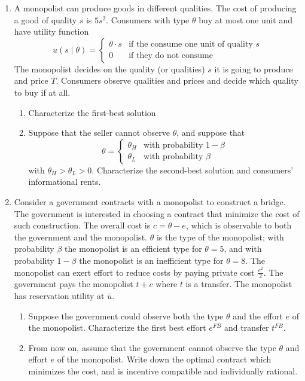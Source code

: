 \documentclass[12pt]{article}
\begin{document}
\begin{enumerate}
	\item A monopolist can produce goods in different qualities. The cost of producing a good of quality $s$ is $5s^2$. Consumers with type $\theta$ buy at most one unit and have utility function
	\[
	u(s \mid \theta) = \begin{cases} \theta \cdot s & \text{if the consume one unit of quality $s$} \\ 0 & \text{if they do not consume} \end{cases}
	\]
	The monopolist decides on the quality (or qualities) $s$ it is going to produce and price $T$. Consumers observe qualities and prices and decide which quality to buy if at all.
	\begin{enumerate}
		\item Characterize the first-best solution
		\item Suppose that the seller cannot observe $\theta$, and suppose that 
		\[
		\theta = \begin{cases} \theta_H & \text{with probability } 1-\beta \\ \theta_L & \text{with probability } \beta \end{cases}
		\]
		with $\theta_H > \theta_L > 0$. Characterize the second-best solution and consumers’ informational rents.
	\end{enumerate}
	\item Consider a government contracts with a monopolist to construct a bridge. The government is interested in choosing a contract that minimize the cost of such construction. The overall cost is $c = \theta - e$, which is observable to both the government and the monopolist. $\theta$ is the type of the monopolist; with probability $\beta$ the monopolist is an efficient type for $\theta = 5$, and with probability $1-\beta$ the monopolist is an inefficient type for $\theta = 8$. The monopolist can exert effort to reduce costs by paying private cost $\frac{e^2}{2}$. The government pays the monopolist $t + c$ where $t$ is a transfer. The monopolist has reservation utility at $\bar{u}$. 
	\begin{enumerate}
		\item Suppose the government could observe both the type $\theta$ and the effort $e$ of the monopolist. Characterize the first best effort $e^{FB}$ and transfer $t^{FB}$. 
		\item From now on, assume that the government cannot observe the type $\theta$ and effort $e$ of the monopolist. Write down the optimal contract which minimizes the cost, and is incentive compatible and individually rational.

\end{enumerate}
\end{enumerate}
\end{document}
